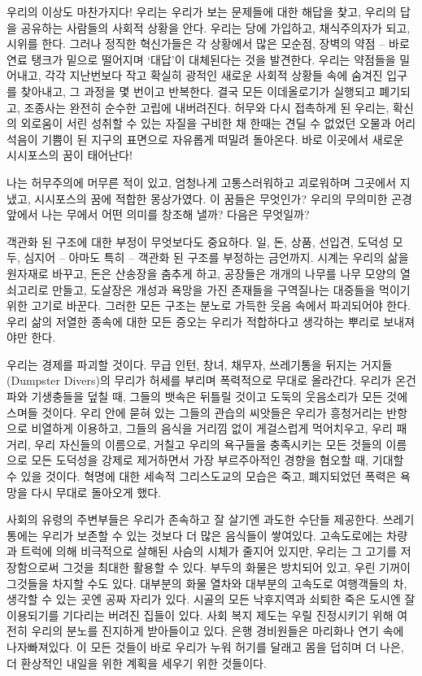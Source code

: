 \documentclass[10pt, b6paper, openany]{memoir}
\begin{document}
\begin{article}
우리의 이상도 마찬가지다! 우리는 우리가 보는 문제들에 대한 해답을 찾고, 우리의 답을 공유하는 사람들의 사회적 상황을 안다. 우리는 당에 가입하고, 채식주의자가 되고, 시위를 한다. 그러나 정직한 혁신가들은 각 상황에서 많은 모순점, 장벽의 약점 -- 바로 연료 탱크가 밑으로 떨어지며 `대답'이 대체된다는 것을 발견한다. 우리는 약점들을 밀어내고, 각각 지난번보다 작고 확실히 광적인 새로운 사회적 상황들 속에 숨겨진 입구를 찾아내고, 그 과정을 몇 번이고 반복한다. 결국 모든 이데올로기가 실행되고 폐기되고, 조종사는 완전히 순수한 고립에 내버려진다. 허무와 다시 접촉하게 된 우리는, 확신의 외로움이 서린 성취할 수 있는 자질을 구비한 채 한때는 견딜 수 없었던 오물과 어리석음이 기쁨이 된 지구의 표면으로 자유롭게 떠밀려 돌아온다. 바로 이곳에서 새로운 시시포스의 꿈이 태어난다! 

나는 허무주의에 머무른 적이 있고, 엄청나게 고통스러워하고 괴로워하며 그곳에서 지냈고, 시시포스의 꿈에 적합한 몽상가였다. 이 꿈들은 무엇인가? 우리의 무의미한 곤경 앞에서 나는 무에서 어떤 의미를 창조해 낼까? 다음은 무엇일까? 

객관화 된 구조에 대한 부정이 무엇보다도 중요하다. 일, 돈, 상품, 선입견, 도덕성 모두, 심지어 -- 아마도 특히 -- 객관화 된 구조를 부정하는 금언까지. 시계는 우리의 삶을 원자재로 바꾸고, 돈은 산송장을 춤추게 하고, 공장들은 개개의 나무를 나무 모양의 열쇠고리로 만들고, 도살장은 개성과 욕망을 가진 존재들을 구역질나는 대중들을 먹이기 위한 고기로 바꾼다. 그러한 모든 구조는 분노로 가득한 웃음 속에서 파괴되어야 한다. 우리 삶의 저열한 종속에 대한 모든 증오는 우리가 적합하다고 생각하는 뿌리로 보내져야만 한다. 

우리는 경제를 파괴할 것이다. 무급 인턴, 창녀, 채무자, 쓰레기통을 뒤지는 거지들(Dumpster Divers)의 무리가 허세를 부리며 폭력적으로 무대로 올라간다. 우리가 온건파와 기생충들을 덮칠 때, 그들의 뱃속은 뒤틀릴 것이고 도둑의 웃음소리가 모든 것에 스며들 것이다. 우리 안에 묻혀 있는 그들의 관습의 씨앗들은 우리가 흥청거리는 반항으로 비열하게 이용하고, 그들의 음식을 거리낌 없이 게걸스럽게 먹어치우고, 우리 패거리, 우리 자신들의 이름으로, 거칠고 우리의 욕구들을 충족시키는 모든 것들의 이름으로 모든 도덕성을 강제로 제거하면서 가장 부르주아적인 경향을 혐오할 때, 기대할 수 있을 것이다. 혁명에 대한 세속적 그리스도교의 모습은 죽고, 폐지되었던 폭력은 욕망을 다시 무대로 돌아오게 했다. 

사회의 유령의 주변부들은 우리가 존속하고 잘 살기엔 과도한 수단들 제공한다. 쓰레기통에는 우리가 보존할 수 있는 것보다 더 많은 음식들이 쌓여있다. 고속도로에는 차량과 트럭에 의해 비극적으로 살해된 사슴의 시체가 줄지어 있지만, 우리는 그 고기를 저장함으로써 그것을 최대한 활용할 수 있다. 부두의 화물은 방치되어 있고, 우린 기꺼이 그것들을 차지할 수도 있다. 대부분의 화물 열차와 대부분의 고속도로 여행객들의 차, 생각할 수 있는 곳엔 공짜 자리가 있다. 시골의 모든 낙후지역과 쇠퇴한 죽은 도시엔 잘 이용되기를 기다리는 버려진 집들이 있다. 사회 복지 제도는 우릴 진정시키기 위해 여전히 우리의 분노를 진지하게 받아들이고 있다. 은행 경비원들은 마리화나 연기 속에 나자빠져있다. 이 모든 것들이 바로 우리가 누워 허기를 달래고 몸을 덥히며 더 나은, 더 환상적인 내일을 위한 계획을 세우기 위한 것들이다.


\end{article}
\end{document}
